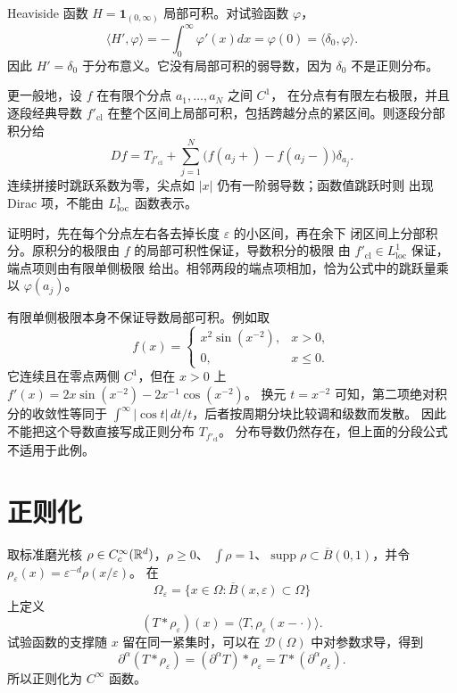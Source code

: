 Heaviside 函数 \(H=\mathbf1_{(0,\infty)}\) 局部可积。对试验函数
\(\varphi\)，
\[
 \langle H',\varphi\rangle
 =-\int_0^\infty\varphi'(x)dx=\varphi(0)
 =\langle\delta_0,\varphi\rangle.
\]
因此 \(H'=\delta_0\) 于分布意义。它没有局部可积的弱导数，因为
\(\delta_0\) 不是正则分布。

更一般地，设 \(f\) 在有限个分点 \(a_1,\ldots,a_N\) 之间 \(C^1\)，
在分点有有限左右极限，并且逐段经典导数 \(f'_{\mathrm{cl}}\)
在整个区间上局部可积，包括跨越分点的紧区间。则逐段分部积分给
\begin{equation}\label{eq:piecewise-distribution-derivative}
 Df=T_{f'_{\mathrm{cl}}}
 +\sum_{j=1}^N\bigl(f(a_j+)-f(a_j-)\bigr)\delta_{a_j}.
\end{equation}
连续拼接时跳跃系数为零，尖点如 \(|x|\) 仍有一阶弱导数；函数值跳跃时则
出现 Dirac 项，不能由 \(L^1_{\rm loc}\) 函数表示。

证明时，先在每个分点左右各去掉长度 \(\varepsilon\) 的小区间，再在余下
闭区间上分部积分。原积分的极限由 \(f\) 的局部可积性保证，导数积分的极限
由 \(f'_{\mathrm{cl}}\in L^1_{\mathrm{loc}}\) 保证，端点项则由有限单侧极限
给出。相邻两段的端点项相加，恰为公式中的跳跃量乘以 \(\varphi(a_j)\)。

有限单侧极限本身不保证导数局部可积。例如取
\[
 f(x)=
 \begin{cases}x^2\sin(x^{-2}),&x>0,\\0,&x\le0.\end{cases}
\]
它连续且在零点两侧 \(C^1\)，但在 \(x>0\) 上
\(f'(x)=2x\sin(x^{-2})-2x^{-1}\cos(x^{-2})\)。
换元 \(t=x^{-2}\) 可知，第二项绝对积分的收敛性等同于
\(\int^\infty |\cos t|\,dt/t\)，后者按周期分块比较调和级数而发散。
因此不能把这个导数直接写成正则分布 \(T_{f'_{\mathrm{cl}}}\)。
分布导数仍然存在，但上面的分段公式不适用于此例。

\section{正则化}

取标准磨光核 \(\rho\in C_c^\infty(\mathbb{R}^d)\)，\(\rho\ge0\)、
\(\int\rho=1\)、\(\operatorname{supp}\rho\subset\overline B(0,1)\)，并令
\(\rho_\varepsilon(x)=\varepsilon^{-d}\rho(x/\varepsilon)\)。
在
\[
 \Omega_\varepsilon=
 \{x\in\Omega:\overline B(x,\varepsilon)\subset\Omega\}
\]
上定义
\[
 (T*\rho_\varepsilon)(x)
 =\langle T,\rho_\varepsilon(x-\cdot)\rangle.
\]
试验函数的支撑随 \(x\) 留在同一紧集时，可以在
\(\mathcal D(\Omega)\) 中对参数求导，得到
\[
 \partial^\alpha(T*\rho_\varepsilon)
 =(\partial^\alpha T)*\rho_\varepsilon
 =T*(\partial^\alpha\rho_\varepsilon).
\]
所以正则化为 \(C^\infty\) 函数。

